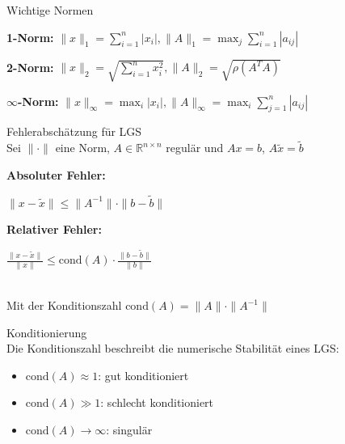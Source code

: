\begin{concept}{Wichtige Normen}

\textbf{1-Norm:}
        $\|x\|_1 = \sum_{i=1}^n |x_i|,
        \|A\|_1 = \max_j \sum_{i=1}^n |a_{ij}|$

\textbf{2-Norm:}
        $\|x\|_2 = \sqrt{\sum_{i=1}^n x_i^2}, 
        \|A\|_2 = \sqrt{\rho(A^TA)}$

$\infty$\textbf{-Norm:}
        $\|x\|_\infty = \max_i |x_i|, 
        \|A\|_\infty = \max_i \sum_{j=1}^n |a_{ij}|$
\end{concept}

\begin{theorem}{Fehlerabschätzung für LGS}\\
Sei $\|\cdot\|$ eine Norm, $A \in \mathbb{R}^{n\times n}$ regulär und $Ax = b$, $A\tilde{x} = \tilde{b}$
\vspace{1mm}\\
\begin{minipage}[t]{0.47\textwidth}
    \textbf{Absoluter Fehler:}
    \begin{center}
        $\|x - \tilde{x}\| \leq \|A^{-1}\| \cdot \|b - \tilde{b}\|$
    \end{center}
\end{minipage}
\hspace{2mm}
\begin{minipage}[t]{0.47\textwidth}
    \textbf{Relativer Fehler:}
    \begin{center}
        $\frac{\|x - \tilde{x}\|}{\|x\|} \leq \text{cond}(A) \cdot \frac{\|b - \tilde{b}\|}{\|b\|}$
    \end{center}
\end{minipage}
\vspace{1mm}\\
Mit der Konditionszahl $\text{cond}(A) = \|A\| \cdot \|A^{-1}\|$
\end{theorem}

\begin{concept}{Konditionierung}\\
Die Konditionszahl beschreibt die numerische Stabilität eines LGS:
\begin{itemize}
    \item $\text{cond}(A) \approx 1$: gut konditioniert
    \item $\text{cond}(A) \gg 1$: schlecht konditioniert
    \item $\text{cond}(A) \to \infty$: singulär
\end{itemize}
\end{concept}

